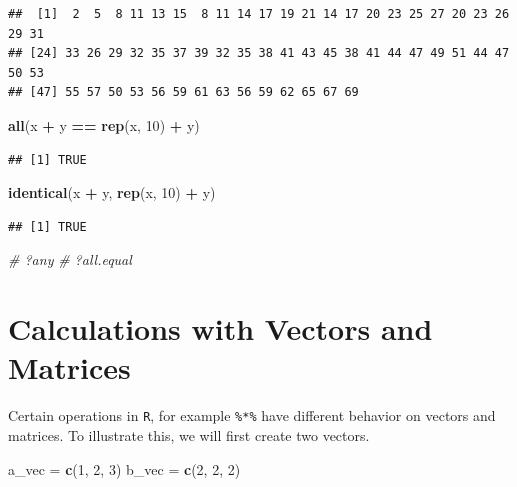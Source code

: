 \documentclass[]{book}
\newenvironment{Shaded}{\begin{snugshade}}{\end{snugshade}}
\newcommand{\KeywordTok}[1]{\textcolor[rgb]{0.13,0.29,0.53}{\textbf{#1}}}
\newcommand{\DecValTok}[1]{\textcolor[rgb]{0.00,0.00,0.81}{#1}}
\newcommand{\StringTok}[1]{\textcolor[rgb]{0.31,0.60,0.02}{#1}}
\newcommand{\CommentTok}[1]{\textcolor[rgb]{0.56,0.35,0.01}{\textit{#1}}}
\newcommand{\OperatorTok}[1]{\textcolor[rgb]{0.81,0.36,0.00}{\textbf{#1}}}
\newcommand{\NormalTok}[1]{#1}
\theoremstyle{definition}
\theoremstyle{definition}
\theoremstyle{definition}
\theoremstyle{remark}
\begin{document}
\begin{verbatim}
##  [1]  2  5  8 11 13 15  8 11 14 17 19 21 14 17 20 23 25 27 20 23 26 29 31
## [24] 33 26 29 32 35 37 39 32 35 38 41 43 45 38 41 44 47 49 51 44 47 50 53
## [47] 55 57 50 53 56 59 61 63 56 59 62 65 67 69
\end{verbatim}

\begin{Shaded}
\begin{Highlighting}[]
\KeywordTok{all}\NormalTok{(x }\OperatorTok{+}\StringTok{ }\NormalTok{y }\OperatorTok{==}\StringTok{ }\KeywordTok{rep}\NormalTok{(x, }\DecValTok{10}\NormalTok{) }\OperatorTok{+}\StringTok{ }\NormalTok{y)}
\end{Highlighting}
\end{Shaded}

\begin{verbatim}
## [1] TRUE
\end{verbatim}

\begin{Shaded}
\begin{Highlighting}[]
\KeywordTok{identical}\NormalTok{(x }\OperatorTok{+}\StringTok{ }\NormalTok{y, }\KeywordTok{rep}\NormalTok{(x, }\DecValTok{10}\NormalTok{) }\OperatorTok{+}\StringTok{ }\NormalTok{y)}
\end{Highlighting}
\end{Shaded}

\begin{verbatim}
## [1] TRUE
\end{verbatim}

\begin{Shaded}
\begin{Highlighting}[]
\CommentTok{# ?any}
\CommentTok{# ?all.equal}
\end{Highlighting}
\end{Shaded}

\section{Calculations with Vectors and
Matrices}\label{calculations-with-vectors-and-matrices}

Certain operations in \texttt{R}, for example \texttt{\%*\%} have
different behavior on vectors and matrices. To illustrate this, we will
first create two vectors.

\begin{Shaded}
\begin{Highlighting}[]
\NormalTok{a_vec =}\StringTok{ }\KeywordTok{c}\NormalTok{(}\DecValTok{1}\NormalTok{, }\DecValTok{2}\NormalTok{, }\DecValTok{3}\NormalTok{)}
\NormalTok{b_vec =}\StringTok{ }\KeywordTok{c}\NormalTok{(}\DecValTok{2}\NormalTok{, }\DecValTok{2}\NormalTok{, }\DecValTok{2}\NormalTok{)}
\end{Highlighting}
\end{Shaded}
\end{document}
